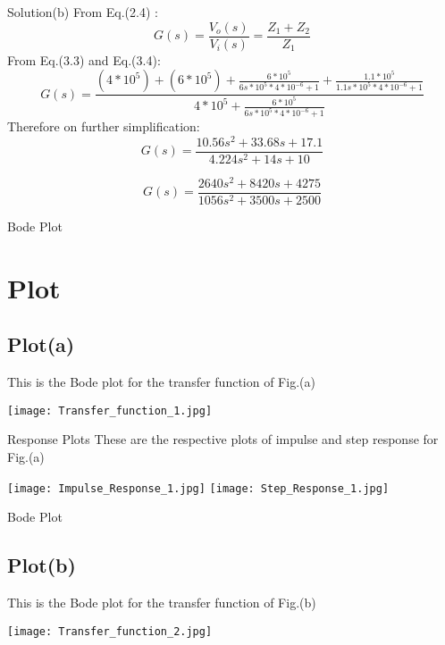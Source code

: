 \documentclass{beamer}
\theoremstyle{remark}
\numberwithin{equation}{section}
\begin{document}
\begin{frame}{Solution(b)}
From Eq.(2.4) :
\begin{equation*}
    G(s) = \frac{V_{o}(s)}{V_{i}(s)} = \frac{Z_1 + Z_2}{Z_1}
\end{equation*}
From Eq.(3.3) and Eq.(3.4):
\begin{equation*}
    G(s) = \frac{(4*10^5)+(6*10^5)+ \frac{6*10^5}{6s*10^5*4*10^{-6} + 1} + \frac{1.1*10^5}{1.1s*10^5*4*10^{-6} + 1}}{4*10^5 + \frac{6*10^5}{6s*10^5*4*10^{-6} + 1}}
\end{equation*}
Therefore on further simplification:
\begin{equation*}
    G(s) = \frac{10.56s^2 + 33.68s + 17.1}{4.224s^2 + 14s + 10}
\end{equation*}

\begin{equation*}
    \boxed{G(s) = \frac{2640s^2 + 8420s + 4275}{1056s^2 + 3500s + 2500}}
\end{equation*}
 
\end{frame}
\begin{frame}{Bode Plot}
\section{Plot}
\subsection{Plot(a)}
This is the Bode plot for the transfer function of Fig.(a)
    \begin{center}
         \texttt{[image: Transfer\_function\_1.jpg]}
     \end{center}
\end{frame}
\begin{frame}{Response Plots}
These are the respective plots of impulse and step response for Fig.(a)
    \begin{center}
         \texttt{[image: Impulse\_Response\_1.jpg]}
         \texttt{[image: Step\_Response\_1.jpg]}
    \end{center}
    
\end{frame}
\begin{frame}{Bode Plot}

\subsection{Plot(b)}
This is the Bode plot for the transfer function of Fig.(b)
    \begin{center}
         \texttt{[image: Transfer\_function\_2.jpg]}
     \end{center}
    
\end{frame}
\end{document}
